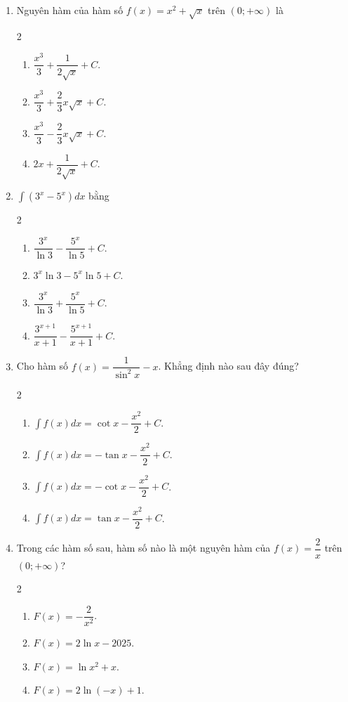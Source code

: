 \documentclass[12pt]{article}
\begin{document}
\begin{enumerate}[label=\textbf{Câu \arabic*.}]
		\item Nguyên hàm của hàm số $f(x) = x^2 + \sqrt{x}$ trên $(0; +\infty)$ là
		\begin{multicols}{2}
			\begin{enumerate}[label=\textbf{\Alph*.}]
				\item $\dfrac{x^3}{3} + \dfrac{1}{2\sqrt{x}} + C$.
				\item $\dfrac{x^3}{3} + \dfrac{2}{3}x\sqrt{x} + C$.
				\item $\dfrac{x^3}{3} - \dfrac{2}{3}x\sqrt{x} + C$.
				\item $2x + \dfrac{1}{2\sqrt{x}} + C$.
			\end{enumerate}
		\end{multicols}
		
		\item $\displaystyle \int (3^x - 5^x) dx$ bằng
		\begin{multicols}{2}
			\begin{enumerate}[label=\textbf{\Alph*.}]
				\item $\dfrac{3^x}{\ln 3} - \dfrac{5^x}{\ln 5} + C$.
				\item $3^x \ln 3 - 5^x \ln 5 + C$.
				\item $\dfrac{3^x}{\ln 3} + \dfrac{5^x}{\ln 5} + C$.
				\item $\dfrac{3^{x+1}}{x+1} - \dfrac{5^{x+1}}{x+1} + C$.
			\end{enumerate}
		\end{multicols}
		
		\item Cho hàm số $f(x) = \dfrac{1}{\sin^2 x} - x$. Khẳng định nào sau đây đúng?
		\begin{multicols}{2}
			\begin{enumerate}[label=\textbf{\Alph*.}]
				\item $\displaystyle \int f(x)dx = \cot x - \dfrac{x^2}{2} + C$.
				\item $\displaystyle \int f(x)dx = -\tan x - \dfrac{x^2}{2} + C$.
				\item $\displaystyle \int f(x)dx = -\cot x - \dfrac{x^2}{2} + C$.
				\item $\displaystyle \int f(x)dx = \tan x - \dfrac{x^2}{2} + C$.
			\end{enumerate}
		\end{multicols}
		
		\item Trong các hàm số sau, hàm số nào là một nguyên hàm của $f(x) = \dfrac{2}{x}$ trên $(0; +\infty)$?
		\begin{multicols}{2}
			\begin{enumerate}[label=\textbf{\Alph*.}]
				\item $F(x) = -\dfrac{2}{x^2}$.
				\item $F(x) = 2\ln x - 2025$.
				\item $F(x) = \ln x^2 + x$.
				\item $F(x) = 2\ln(-x) + 1$.
			\end{enumerate}
		\end{multicols}
		

\end{enumerate}
\end{document}
